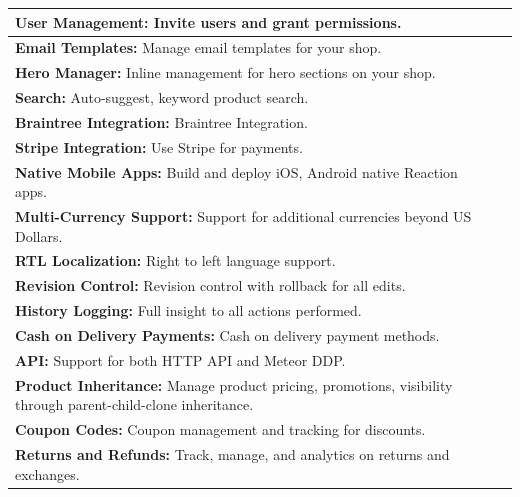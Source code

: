 \begin{table}[h!]
\begin{tabular}{ |L{0.6\paperwidth}|L{0.1\paperwidth}|}
\\ \hline
	\textbf{ User Management:} Invite users and grant permissions.&
	
\\ \hline
	\textbf{ Email Templates:} Manage email templates for your shop.&
	
\\ \hline
	\textbf{ Hero Manager:} Inline management for hero sections on your shop.&
	
\\ \hline
	\textbf{ Search:} Auto-suggest, keyword product search.&
	
\\ \hline
	\textbf{ Braintree Integration:} Braintree Integration.&
	
\\ \hline
	\textbf{ Stripe Integration:} Use Stripe for payments.&
	
\\ \hline
	\textbf{ Native Mobile Apps:} Build and deploy iOS, Android native Reaction apps.&
	
\\ \hline
	\textbf{ Multi-Currency Support:} Support for additional currencies beyond US Dollars.&
	
\\ \hline
	\textbf{ RTL Localization:} Right to left language support.&
	
\\ \hline
	\textbf{ Revision Control:} Revision control with rollback for all edits.&
	
\\ \hline
	\textbf{ History Logging:} Full insight to all actions performed.&
	
\\ \hline
	\textbf{ Cash on Delivery Payments:} Cash on delivery payment methods.&
	
\\ \hline
	\textbf{ API:} Support for both HTTP API and Meteor DDP.&
	
\\ \hline
	\textbf{ Product Inheritance:} Manage product pricing, promotions, visibility through parent-child-clone inheritance.&
	
\\ \hline
	\textbf{ Coupon Codes:} Coupon management and tracking for discounts.&
	
\\ \hline
	\textbf{ Returns and Refunds:} Track, manage, and analytics on returns and exchanges.&
	

\end{tabular}
\end{table}
